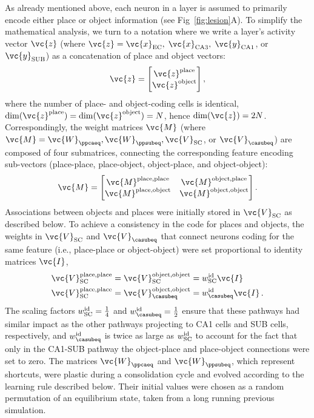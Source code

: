 As already mentioned above, each neuron in a layer is assumed to primarily encode either place or object information (see Fig~\ref{fig:lesion}A). To simplify the mathematical analysis, we turn to a notation where we write a layer's activity vector $\vc{z}$ (where $\vc{z}=\vc{x}_{\rm EC},\;\vc{x}_{\rm CA3},\;\vc{y}_{\rm CA1}$, or $\vc{y}_{\rm SUB}$) as a concatenation of place and object vectors:
\begin{align}
  \vc{z} = \left[\begin{matrix}
              \vc{z}^{\mathrm{place}} \\
              \vc{z}^{\mathrm{object}}
           \end{matrix}\right],
\end{align}
where the number of place- and object-coding cells is identical, $\mathrm{dim}(\vc{z}^{\mathrm{place}}) = \mathrm{dim}(\vc{z}^{\mathrm{object}})= N$, hence $\mathrm{dim}(\vc{z})=2N$.
Correspondingly, the weight matrices $\vc{M}$ (where $\vc{M}=\vc{W}_{\ppcaeq}, \vc{W}_{\ppsubeq}, \vc{V}_{\rm SC}$, or $\vc{V}_{\casubeq}$) are composed of four submatrices, connecting the corresponding feature encoding sub-vectors (place-place, place-object, object-place, and object-object):
\begin{align}
 \vc{M} = \left[\begin{matrix}
      \vc{M}^{\mathrm{place},\mathrm{place}} &
      \vc{M}^{\mathrm{object}, \mathrm{place}} \\
      \vc{M}^{\mathrm{place}, \mathrm{object}} & \vc{M}^{\mathrm{object},\mathrm{object}}
     \end{matrix}\right].
     \label{eq:GenericPlaceObjectMatrix}
\end{align}
Associations between objects and places were initially stored in $\vc{V}_{\rm SC}$ as described below. To achieve a consistency in the code for places and objects, the weights in $\vc{V}_{\rm SC}$ and $\vc{V}_{\casubeq}$ that connect neurons coding for the same feature (i.e., place-place or object-object) were set proportional to identity matrices $\vc{I}$,
\begin{align}
    \vc{V}_{\rm{SC}}^{\mathrm{place},\mathrm{place}} & = \vc{V}_{\rm{SC}}^{\mathrm{object},\mathrm{object}} = w^{\rm id}_{\rm SC} \vc{I} \\
    \vc{V}_{\rm{SC}}^{\mathrm{place},\mathrm{place}} & = \vc{V}_{\casubeq}^{\mathrm{object},\mathrm{object}} = w^{\rm id}_{\casubeq} \vc{I} \,.
\end{align}
The scaling factors $w^{\rm id}_{\rm SC}=\frac{1}{4}$ and $w^{\rm id}_{\casubeq}=\frac{1}{2}$ ensure that these pathways had similar impact as the other pathways projecting to CA1 cells and SUB cells, respectively, and $w^{\rm id}_{\casubeq}$ is twice as large as $w^{\rm id}_{\rm SC}$  to account for the fact that only in the CA1-SUB pathway the object-place and place-object connections were set to zero. The matrices $\vc{W}_{\ppcaeq}$ and $\vc{W}_{\ppsubeq}$, which represent shortcuts, were plastic during a consolidation cycle and evolved according to the learning rule described below. Their initial values were chosen as a random permutation of an equilibrium state, taken from a long running previous simulation.

